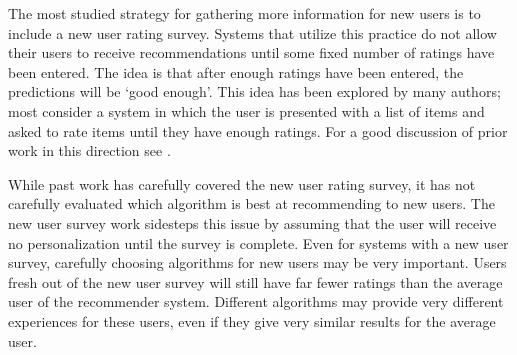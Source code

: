 \documentclass[letterpaper]{sig-alternate}
\begin{document}
 
  The most studied strategy for gathering more information for new users is to include a new user rating survey.
  Systems that utilize this practice do not allow their users to receive recommendations until some fixed number of ratings have been entered.
  The idea is that after enough ratings have been entered, the predictions will be `good enough'.
  This idea has been explored by many authors; most consider a system in which the user is presented with a list of items and asked to rate items until they have enough ratings.
  For a good discussion of prior work in this direction see \cite{adaptiveBootstrapping}.



  While past work has carefully covered the new user rating survey, it has not carefully evaluated which algorithm is best at recommending to new users.
  The new user survey work sidesteps this issue by assuming that the user will receive no personalization until the survey is complete.
  Even for systems with a new user survey, carefully choosing algorithms for new users may be very important.
  Users fresh out of the new user survey will still have far fewer ratings than the average user of the recommender system.
  Different algorithms may provide very different experiences for these users, even if they give very similar results for the average user.
  
\end{document}
